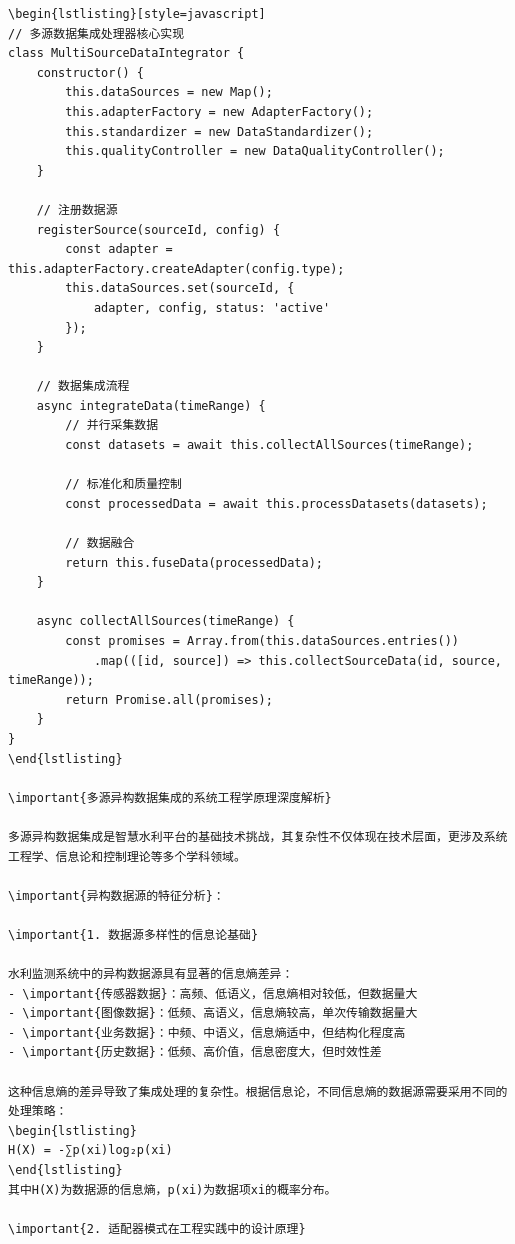\begin{verbatim}
\begin{lstlisting}[style=javascript]
// 多源数据集成处理器核心实现
class MultiSourceDataIntegrator {
    constructor() {
        this.dataSources = new Map();
        this.adapterFactory = new AdapterFactory();
        this.standardizer = new DataStandardizer();
        this.qualityController = new DataQualityController();
    }
    
    // 注册数据源
    registerSource(sourceId, config) {
        const adapter = this.adapterFactory.createAdapter(config.type);
        this.dataSources.set(sourceId, {
            adapter, config, status: 'active'
        });
    }
    
    // 数据集成流程
    async integrateData(timeRange) {
        // 并行采集数据
        const datasets = await this.collectAllSources(timeRange);
        
        // 标准化和质量控制
        const processedData = await this.processDatasets(datasets);
        
        // 数据融合
        return this.fuseData(processedData);
    }
    
    async collectAllSources(timeRange) {
        const promises = Array.from(this.dataSources.entries())
            .map(([id, source]) => this.collectSourceData(id, source, timeRange));
        return Promise.all(promises);
    }
}
\end{lstlisting}

\important{多源异构数据集成的系统工程学原理深度解析}

多源异构数据集成是智慧水利平台的基础技术挑战，其复杂性不仅体现在技术层面，更涉及系统工程学、信息论和控制理论等多个学科领域。

\important{异构数据源的特征分析}：

\important{1. 数据源多样性的信息论基础}

水利监测系统中的异构数据源具有显著的信息熵差异：
- \important{传感器数据}：高频、低语义，信息熵相对较低，但数据量大
- \important{图像数据}：低频、高语义，信息熵较高，单次传输数据量大
- \important{业务数据}：中频、中语义，信息熵适中，但结构化程度高
- \important{历史数据}：低频、高价值，信息密度大，但时效性差

这种信息熵的差异导致了集成处理的复杂性。根据信息论，不同信息熵的数据源需要采用不同的处理策略：
\begin{lstlisting}
H(X) = -∑p(xi)log₂p(xi)
\end{lstlisting}
其中H(X)为数据源的信息熵，p(xi)为数据项xi的概率分布。

\important{2. 适配器模式在工程实践中的设计原理}


\end{verbatim}
